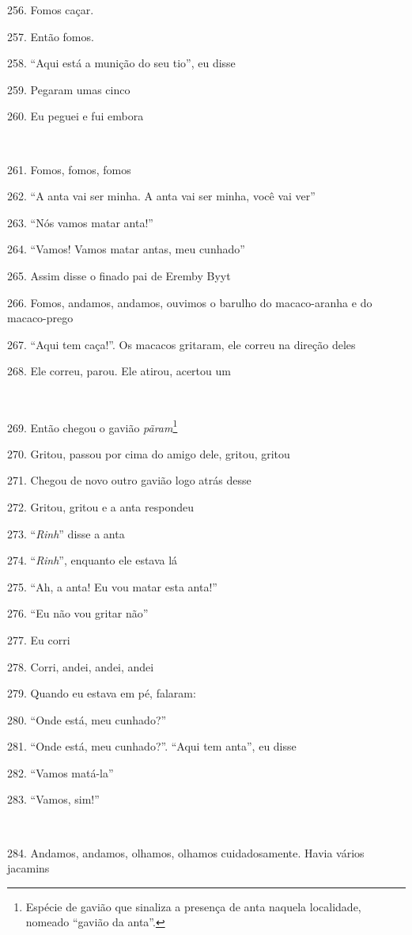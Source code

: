 256. Fomos caçar.

257. Então fomos.

258. ``Aqui está a munição do seu tio'', eu disse

259. Pegaram umas cinco

260. Eu peguei e fui embora

~

261. Fomos, fomos, fomos

262. ``A anta vai ser minha. A anta vai ser minha, você vai ver''

263. ``Nós vamos matar anta!''

264. ``Vamos! Vamos matar antas, meu cunhado''

265. Assim disse o finado pai de Eremby Byyt

266. Fomos, andamos, andamos, ouvimos o barulho do macaco-aranha e do
macaco-prego

267. ``Aqui tem caça!''. Os macacos gritaram, ele correu na direção deles

268. Ele correu, parou. Ele atirou, acertou um

~

269. Então chegou o gavião \emph{pãram}\footnote{Espécie de gavião que
  sinaliza a presença de anta naquela localidade, nomeado ``gavião da
  anta''.}

270. Gritou, passou por cima do amigo dele, gritou, gritou

271. Chegou de novo outro gavião logo atrás desse

272. Gritou, gritou e a anta respondeu

273. ``\emph{Rinh}'' disse a anta

274. ``\emph{Rinh}'', enquanto ele estava lá

275. ``Ah, a anta! Eu vou matar esta anta!''

276. ``Eu não vou gritar não''

277. Eu corri

278. Corri, andei, andei, andei

279. Quando eu estava em pé, falaram:

280. ``Onde está, meu cunhado?''

281. ``Onde está, meu cunhado?''. ``Aqui tem anta'', eu disse

282. ``Vamos matá-la''

283. ``Vamos, sim!''

~

284. Andamos, andamos, olhamos, olhamos cuidadosamente. Havia vários jacamins

